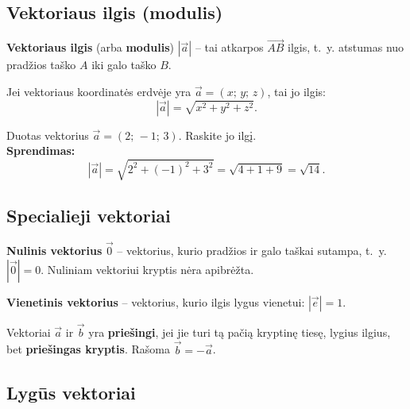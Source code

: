 \subsection{Vektoriaus ilgis (modulis)}

\begin{definition}
\textbf{Vektoriaus ilgis} (arba \textbf{modulis}) $|\vec{a}|$ -- tai atkarpos 
$\overrightarrow{AB}$ ilgis, t.~y. atstumas nuo pradžios taško $A$ iki galo taško $B$.
\end{definition}

Jei vektoriaus koordinatės erdvėje yra $\vec{a} = (x;\, y;\, z)$, tai jo ilgis:
\[
    |\vec{a}| = \sqrt{x^2 + y^2 + z^2}.
\]

\begin{example}
Duotas vektorius $\vec{a} = (2;\,-1;\,3)$. Raskite jo ilgį.\\[4pt]
\textbf{Sprendimas:}
\[
    |\vec{a}| = \sqrt{2^2 + (-1)^2 + 3^2} = \sqrt{4 + 1 + 9} = \sqrt{14}.
\]
\end{example}

\subsection{Specialieji vektoriai}

\begin{definition}
\textbf{Nulinis vektorius} $\vec{0}$ -- vektorius, kurio pradžios ir galo taškai sutampa, 
t.~y. $|\vec{0}| = 0$. Nuliniam vektoriui kryptis nėra apibrėžta.
\end{definition}

\begin{definition}
\textbf{Vienetinis vektorius} -- vektorius, kurio ilgis lygus vienetui: $|\vec{e}| = 1$.
\end{definition}

\begin{definition}
Vektoriai $\vec{a}$ ir $\vec{b}$ yra \textbf{priešingi}, jei jie turi tą pačią kryptinę 
tiesę, lygius ilgius, bet \textbf{priešingas kryptis}. Rašoma $\vec{b} = -\vec{a}$.
\end{definition}

\subsection{Lygūs vektoriai}

